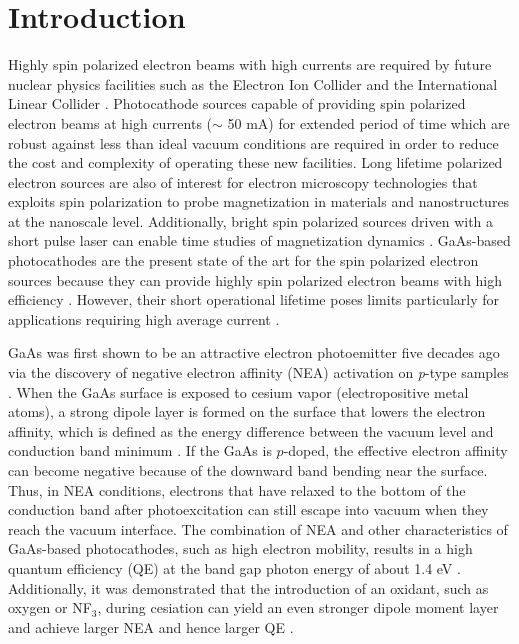\section{Introduction}
Highly spin polarized electron beams with high currents are required by future nuclear physics facilities such as the Electron Ion Collider and the International Linear Collider \cite{eic,lrpns,nsac}. Photocathode sources capable of providing spin polarized electron beams at high currents ($\sim$ 50 mA) \cite{NASreport} for extended period of time which are robust against less than ideal vacuum conditions are required in order to reduce the cost and complexity of operating these new facilities. Long lifetime polarized electron sources are also of interest for electron microscopy technologies that exploits spin polarization to probe magnetization in materials and nanostructures at the nanoscale level. Additionally, bright spin polarized sources driven with a short pulse laser can enable time studies of magnetization dynamics \cite{suzuki2010_RealTimeMagnetic, kuwahara2012_30kVSpinpolarizedTransmission,vollmer2003}.
GaAs-based photocathodes are the present state of the art for the spin polarized electron sources because they can provide highly spin polarized electron beams with high efficiency \cite{liu2016_RecordlevelQuantumEfficiency}.
However, their short operational lifetime poses limits particularly for applications requiring high average current \cite{cardman2018}.

GaAs was first shown to be an attractive electron photoemitter five decades ago via the discovery of negative electron affinity (NEA) activation on \emph{p}-type samples \cite{scheer1965}.
When the GaAs surface is exposed to cesium vapor (electropositive metal atoms), a strong dipole layer is formed on the surface that lowers the electron affinity, which is defined as the energy difference between the vacuum level and conduction band minimum \cite{liu2017_ComprehensiveEvaluationFactors}. If the GaAs is $p$-doped, the effective electron affinity can become negative because of the downward band bending near the surface. Thus, in NEA conditions, electrons that have relaxed to the bottom of the conduction band after photoexcitation can still escape into vacuum when they reach the vacuum interface. The combination of NEA and other characteristics of GaAs-based photocathodes, such as high electron mobility, results in a high quantum efficiency (QE) at the band gap photon energy of about 1.4 eV \cite{pierce1976}. Additionally, it was demonstrated that the introduction of an oxidant, such as oxygen or NF$_3$, during cesiation can yield an even stronger dipole moment layer and achieve larger NEA and hence larger QE \cite{su1983,ciccacci1991_ComparativeStudyPreparation}.



